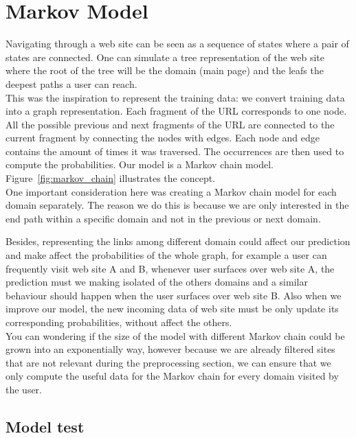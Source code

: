 \section{Markov Model}\label{sec:models}

Navigating through a web site can be seen as a sequence of states where a pair of states are connected. One can simulate a tree representation of the web site where the root of the tree will be the domain (main page) and the leafs the deepest paths a user can reach.
\\[2ex]
This was the inspiration to represent the training data: we convert training data into a graph representation. Each fragment of the URL corresponds to one node. All the possible previous and next fragments of the URL are connected to the current fragment by connecting the nodes with edges. Each node and edge contains the amount of times it was traversed. The occurrences are then used to compute the probabilities. Our model is a Markov chain model. Figure~\ref{fig:markov_chain} illustrates the concept.
\\[2ex]
One important consideration here was creating a Markov chain model for each domain separately. The reason we do this is because we are only interested in the end path within a specific domain and not in the previous or next domain. 

Besides, representing the links among different domain could affect our prediction and make affect the probabilities of the whole graph, for example a user can frequently visit web site A and B, whenever user surfaces over web site A, the prediction must we making isolated of the others domains and a similar behaviour should happen when the user surfaces over web site B. Also when we improve our model, the new incoming data of web site must be only update its corresponding probabilities, without affect the others.
\\[2ex]
You can wondering if the size of the model with different Markov chain could be grown into an exponentially way, however because we are already filtered sites that are not relevant during the preprocessing section, we can ensure that we only compute the useful data for the Markov chain for every domain visited by the user.

\subsection{Model test}\label{subsec:model_test}

